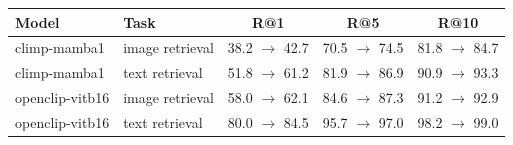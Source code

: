 \begin{tabular}{llccc}
\toprule
Model & Task & R@1 & R@5 & R@10 \\
\midrule
climp-mamba1 & image retrieval & 38.2 $\to$ 42.7 & 70.5 $\to$ 74.5 & 81.8 $\to$ 84.7 \\
climp-mamba1 & text retrieval & 51.8 $\to$ 61.2 & 81.9 $\to$ 86.9 & 90.9 $\to$ 93.3 \\
openclip-vitb16 & image retrieval & 58.0 $\to$ 62.1 & 84.6 $\to$ 87.3 & 91.2 $\to$ 92.9 \\
openclip-vitb16 & text retrieval & 80.0 $\to$ 84.5 & 95.7 $\to$ 97.0 & 98.2 $\to$ 99.0 \\
\bottomrule
\end{tabular}
